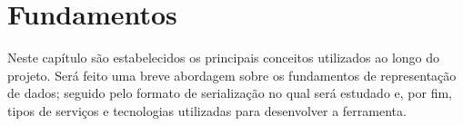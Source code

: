 \chapter{Fundamentos}

Neste capítulo são estabelecidos os principais conceitos utilizados ao longo do projeto. Será feito uma breve abordagem sobre os fundamentos de representação de dados; seguido pelo formato de serialização no qual será estudado e, por fim, tipos de serviços e tecnologias utilizadas para desenvolver a ferramenta.





